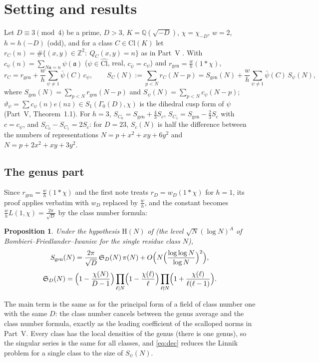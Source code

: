 ﻿\documentclass[11pt]{amsart}
\newtheorem{proposition}[theorem]{Proposition}
\theoremstyle{remark}
\newcommand{\Z}{\mathbb Z}
\newcommand{\Q}{\mathbb Q}
\newcommand{\sS}{\mathfrak S}
\newcommand{\vt}{\vartheta}
\newcommand{\Cl}{\mathrm{Cl}}
\newcommand{\gen}{\mathrm{gen}}
\begin{document}
\begin{abstract}
according to the parity of $N$ and $\chi(2)$, unconditionally; only the problem for every individual $N$ remains.
\end{abstract}
\maketitle

\section{Setting and results}

Let $D\equiv3\pmod4$ be a prime, $D>3$, $K=\Q(\sqrt{-D})$, $\chi=\chi_{-D}$, $w=2$, $h=h(-D)$ (odd), and for a class $C\in\Cl(K)$ let $r_C(n)=\#\{(x,y)\in\Z^2:\ Q_C(x,y)=n\}$ as in Part~V \cite{ChenV}. With $c_\psi(n)=\sum_{N\mathfrak a=n}\psi(\mathfrak a)$ ($\psi\in\widehat{\Cl}$, real, $c_{\bar\psi}=c_\psi$) and $r_\gen=\frac wh(1*\chi)$,
\begin{equation}\label{eq:dec}
r_C=r_\gen+\frac wh\sum_{\psi\ne1}\bar\psi(C)\,c_\psi,\qquad
S_C(N):=\sum_{p<N}r_C(N-p)=S_\gen(N)+\frac wh\sum_{\psi\ne1}\bar\psi(C)\,S_\psi(N),
\end{equation}
where $S_\gen(N)=\sum_{p<N}r_\gen(N-p)$ and $S_\psi(N)=\sum_{p<N}c_\psi(N-p)$; $\vt_\psi=\sum c_\psi(n)e(nz)\in S_1(\Gamma_0(D),\chi)$ is the dihedral cusp form of $\psi$ (Part~V, Theorem~1.1). For $h=3$, $S_{C_0}=S_\gen+\frac43S_c$, $S_{C_1}=S_\gen-\frac23S_c$ with $c=c_\psi$, and $S_{C_0}-S_{C_1}=2S_c$: for $D=23$, $S_c(N)$ is half the difference between the numbers of representations $N=p+x^2+xy+6y^2$ and $N=p+2x^2+xy+3y^2$.

\subsection{The genus part}
Since $r_\gen=\frac wh(1*\chi)$ and the first note \cite{ChenL} treats $r_D=w_D(1*\chi)$ for $h=1$, its proof applies verbatim with $w_D$ replaced by $\frac wh$, and the constant becomes $\frac whL(1,\chi)=\frac{2\pi}{\sqrt D}$ by the class number formula:

\begin{proposition}\label{prop:genus}
Under the hypothesis $\mathrm H(N)$ of \cite[Hypothesis~1.1]{ChenL} (the level $\sqrt N(\log N)^A$ of Bombieri--Friedlander--Iwaniec for the single residue class $N$),
\[
S_\gen(N)=\frac{2\pi}{\sqrt D}\,\sS_D(N)\,\pi(N)+O\Bigl(N\Bigl(\frac{\log\log N}{\log N}\Bigr)^2\Bigr),\]\[\sS_D(N)=\Bigl(1-\frac{\chi(N)}{D-1}\Bigr)\prod_{\ell\mid N}\Bigl(1-\frac{\chi(\ell)}\ell\Bigr)\prod_{\ell\nmid N}\Bigl(1+\frac{\chi(\ell)}{\ell(\ell-1)}\Bigr).
\]
\end{proposition}
The main term is the same as for the principal form of a field of class number one with the same $D$: the class number cancels between the genus average and the class number formula, exactly as the leading coefficient of the scalloped norms in Part~V. Every class has the local densities of the genus (there is one genus), so the singular series is the same for all classes, and \eqref{eq:dec} reduces the Linnik problem for a single class to the size of $S_\psi(N)$.
\end{document}
